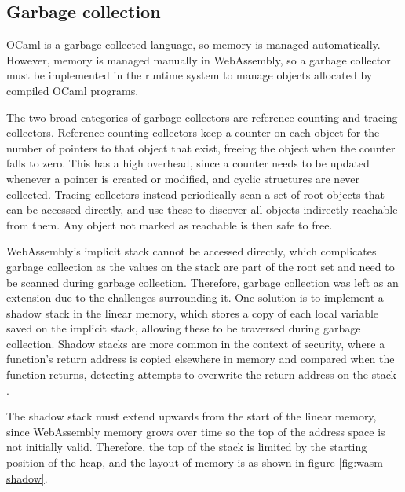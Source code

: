 \subsection{Garbage collection}
OCaml is a garbage-collected language, so memory is managed automatically. However, memory is managed manually in WebAssembly, so a garbage collector must be implemented in the runtime system to manage objects allocated by compiled OCaml programs.

The two broad categories of garbage collectors are reference-counting and tracing collectors. Reference-counting collectors keep a counter on each object for the number of pointers to that object that exist, freeing the object when the counter falls to zero. This has a high overhead, since a counter needs to be updated whenever a pointer is created or modified, and cyclic structures are never collected. Tracing collectors instead periodically scan a set of root objects that can be accessed directly, and use these to discover all objects indirectly reachable from them. Any object not marked as reachable is then safe to free. 

WebAssembly's implicit stack cannot be accessed directly, which complicates garbage collection as the values on the stack are part of the root set and need to be scanned during garbage collection. Therefore, garbage collection was left as an extension due to the challenges surrounding it. One solution is to implement a shadow stack in the linear memory, which stores a copy of each local variable saved on the implicit stack, allowing these to be traversed during garbage collection. Shadow stacks are more common in the context of security, where a function's return address is copied elsewhere in memory and compared when the function returns, detecting attempts to overwrite the return address on the stack \cite{shadow-stack}. %

The shadow stack must extend upwards from the start of the linear memory, since WebAssembly memory grows over time so the top of the address space is not initially valid. Therefore, the top of the stack is limited by the starting position of the heap, and the layout of memory is as shown in figure \ref{fig:wasm-shadow}. %


